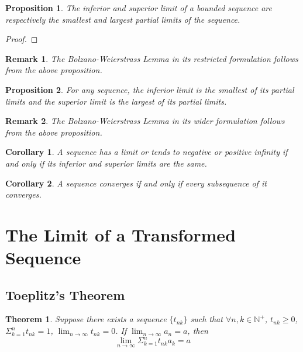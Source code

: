 \documentclass[onecolumn]{ctexart}
\newtheorem{theorem}{Theorem}
\newtheorem{proposition}{Proposition}
\newtheorem{corollary}{Corollary}
\newtheorem{remark}{Remark}
\begin{document}
\begin{proposition}
  The inferior and superior limit of a bounded sequence are respectively the 
  smallest and largest partial limits of the sequence.
\end{proposition}
\begin{proof}
  
\end{proof}

\begin{remark}
  The Bolzano-Weierstrass Lemma in its restricted formulation follows from the 
  above proposition.
\end{remark}

\begin{proposition}
  For any sequence, the inferior limit is the smallest of its partial limits and 
  the superior limit is the largest of its partial limits.
\end{proposition}

\begin{remark}
  The Bolzano-Weierstrass Lemma in its wider formulation follows from the above 
  proposition.
\end{remark}

\begin{corollary}
  A sequence has a limit or tends to negative or positive infinity if and only if 
  its inferior and superior limits are the same.
\end{corollary}

\begin{corollary}
  A sequence converges if and only if every subsequence of it converges.
\end{corollary}

\section{The Limit of a Transformed Sequence}

\subsection{Toeplitz's Theorem}

\begin{theorem}
  Suppose there exists a sequence $\{t_{nk}\}$ such that 
  $\forall n, k \in \mathbb{N^+}$, $t_{nk} \geq 0$, $\Sigma_{k=1}^n t_{nk} = 1$, 
  $\lim_{n \to \infty} t_{nk} = 0$. If $\lim_{n \to \infty} a_n = a$, then 
  \[
    \lim_{n \to \infty} \Sigma_{k=1}^n t_{nk} a_k = a
  \]
\end{theorem}
\end{document}
